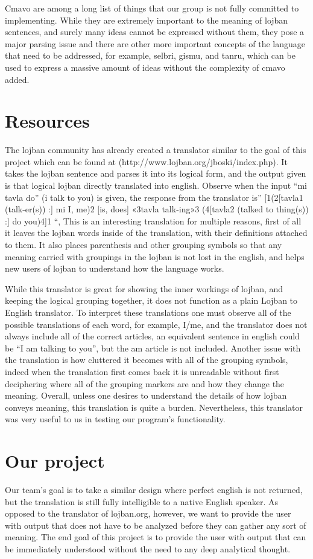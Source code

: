 \documentclass[11pt,letterpaper]{article}
\begin{document}
	Cmavo are among a long list of things that our group is not fully committed to implementing. While they are extremely important to the meaning of lojban sentences, and surely many ideas cannot be expressed without them, they pose a major parsing issue and there are other more important concepts of the language that need to be addressed, for example, selbri, gismu, and tanru, which can be used to express a massive amount of ideas without the complexity of cmavo added.
\section{Resources}
	The lojban community has already created a translator similar to the goal of this project which can be found at (http://www.lojban.org/jboski/index.php). It takes the lojban sentence and parses it into its logical form, and the output given is that logical lojban directly translated into english. Observe when the input “mi tavla do” (i talk to you) is given, the response from the translator is” [1(2[tavla1 (talk-er(s)) :] mi I, me)2 [is, does] «3tavla talk-ing»3 (4[tavla2 (talked to thing(s)) :] do you)4]1 “, This is an interesting translation for multiple reasons, first of all it leaves the lojban words inside of the translation, with their definitions attached to them. It also places parenthesis and other grouping symbols so that any meaning carried with groupings in the lojban is not lost in the english, and helps new users of lojban to understand how the language works.

	While this translator is great for showing the inner workings of lojban, and keeping the logical grouping together, it does not function as a plain Lojban to English translator. To interpret these translations one must observe all of the possible translations of each word, for example, I/me, and the translator does not always include all of the correct articles, an equivalent sentence in english could be “I am talking to you”, but the am article is not included. Another issue with the translation is how cluttered it becomes with all of the grouping symbols, indeed when the translation first comes back it is unreadable without first deciphering where all of the grouping markers are and how they change the meaning. Overall, unless one desires to understand the details of how lojban conveys meaning, this translation is quite a burden.  Nevertheless, this translator was very useful to us in testing our program’s functionality.  
\section{Our project}
	Our team’s goal is to take a similar design where perfect english is not returned, but the translation is still fully intelligible to a native English speaker. As opposed to the translator of lojban.org, however, we want to provide the user with output that does not have to be analyzed before they can gather any sort of meaning. The end goal of this project is to provide the user with output that can be immediately understood without the need to any deep analytical thought.
\end{document}
